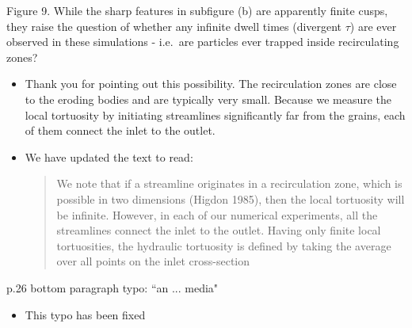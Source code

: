 \documentclass[11pt]{article}
\newcommand{\comment}[1]{{\color{blue} #1}}
\begin{document}
\noindent
\comment{Figure 9.  While the sharp features in subfigure (b) are
apparently finite cusps, they raise the question of whether any infinite
dwell times (divergent $\tau$) are ever observed in these simulations -
i.e.~are particles ever trapped inside recirculating zones?}
\begin{itemize}
  \item Thank you for pointing out this possibility. The
    recirculation zones are close to the eroding bodies and are
    typically very small. Because we measure the local tortuosity by
    initiating streamlines significantly far from the grains, each of
    them connect the inlet to the outlet.

  \item We have updated the text to read:
    \begin{quotation}
      \noindent
      We note that if a streamline originates in a recirculation zone,
      which is possible in two dimensions (Higdon 1985), then the local
      tortuosity will be infinite. However, in each of our numerical
      experiments, all the streamlines connect the inlet to the outlet.
      Having only finite local tortuosities, the hydraulic tortuosity is
      defined by taking the average over all points on the inlet
      cross-section
    \end{quotation}
\end{itemize}

\noindent
\comment{p.26 bottom paragraph typo: ``an ... media"}
\begin{itemize}
  \item This typo has been fixed
\end{itemize}
\end{document}

